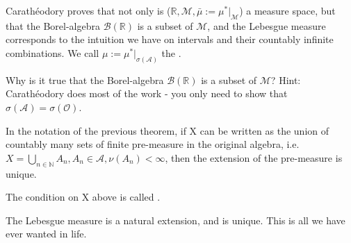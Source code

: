 \documentclass[11pt]{scrartcl}
\begin{document}
\begin{example}
Carath\'eodory proves that not only is ($\mathbb{R},\mathcal{M},\bar{\mu}:=\mu^*|_\mathcal{M} $) a measure space, but that the Borel-algebra $\mathcal{B}(\mathbb{R})$ is a subset of $\mathcal{M}$, and the Lebesgue measure corresponds to the intuition we have on intervals and their countably infinite combinations. We call $\mu := \mu^*|_{\sigma(\mathcal{A})}$ the .
\end{example}

\begin{exercise}
Why is it true that the Borel-algebra $\mathcal{B}(\mathbb{R})$ is a subset of $\mathcal{M}$? Hint: Carath\'eodory does most of the work - you only need to show that $\sigma(\mathcal{A}) = \sigma(\mathcal{O})$.
\end{exercise}

\begin{theorem} In the notation of the previous theorem, if X can be written as the  union of countably many sets of finite pre-measure in the original algebra, i.e. $X = \bigcup_{n\in \mathbb{N}} A_n, A_n \in \mathcal{A}, \nu(A_n) < \infty $, then the extension of the pre-measure is unique.
\end{theorem}

\begin{remark}
The condition on X above is called .
\end{remark}

\begin{example}
The Lebesgue measure is a natural extension, and is unique. This is all we have ever wanted in life.
\end{example}
\end{document}
